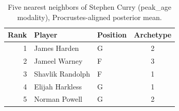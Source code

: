 \begin{table}[htbp]
  \centering\small
  \begin{tabular}{rllc}
    \toprule
    Rank & Player & Position & Archetype \\
    \midrule
    1 & James Harden & G & 2 \\
    2 & Jameel Warney & F & 3 \\
    3 & Shavlik Randolph & F & 1 \\
    4 & Elijah Harkless & G & 1 \\
    5 & Norman Powell & G & 2 \\
    \bottomrule
  \end{tabular}
  \caption{Five nearest neighbors of Stephen Curry (peak_age modality), Procrustes-aligned posterior mean.}
  \label{tab:Stephen_Curry_neighbors_peak_age}
\end{table}

